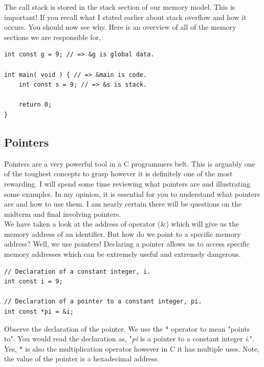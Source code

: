 \documentclass[12pt,extarticle]{article}
\begin{document}
The call stack is stored in the stack section of our memory model. This is important! If you recall what I stated earlier about stack overflow and how it occurs. You should now see why. Here is an overview of all of the memory sections we are responsible for,\\

\lstset {
	language=c
}
\begin{lstlisting}
int const g = 9; // => &g is global data.

int main( void ) { // => &main is code.
	int const s = 9; // => &s is stack.
	
	return 0;
}
\end{lstlisting}

\subsection{Pointers}

Pointers are a very powerful tool in a C programmers belt. This is arguably one of the toughest concepts to grasp however it is definitely one of the most rewarding. I will spend some time reviewing what pointers are and illustrating some examples. In my opinion, it is essential for you to understand what pointers are and how to use them. I am nearly certain there will be questions on the midterm and final involving pointers.\\

We have taken a look at the address of operator (\&) which will give us the memory address of an identifier. But how do we point to a specific memory address? Well, we use pointers! Declaring a pointer allows us to access specific memory addresses which can be extremely useful and extremely dangerous.\\

\lstset {
	language=c
}
\begin{lstlisting}
// Declaration of a constant integer, i.
int const i = 9;

// Declaration of a pointer to a constant integer, pi.
int const *pi = &i;
\end{lstlisting}

Observe the declaration of the pointer. We use the * operator to mean "points to". You would read the declaration as, "\textit{pi} is a pointer to a constant integer \textit{i}.". Yes, * is also the multiplication operator however in C it has multiple uses. Note, the value of the pointer is a hexadecimal address.\\
\end{document}
